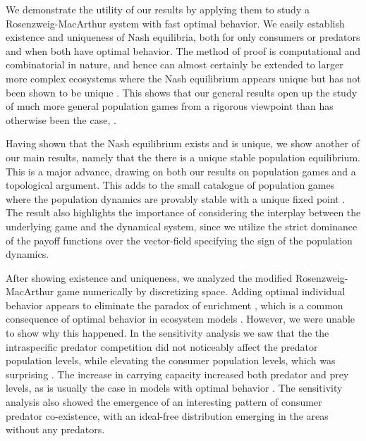 We demonstrate the utility of our results by applying them to study a Rosenzweig-MacArthur system with fast optimal behavior. We easily establish existence and uniqueness of Nash equilibria, both for only consumers or predators and when both have optimal behavior. The method of proof is computational and combinatorial in nature, and hence can almost certainly be extended to larger more complex ecosystems where the Nash equilibrium appears unique but has not been shown to be unique \cite{pinti2019trophic}. This shows that our general results open up the study of much more general population games from a rigorous viewpoint than has otherwise been the case, \citep{cressman2010ideal, kvrivan2013behavioral, kvrivan2009evolutionary, broom2013game}.

Having shown that the Nash equilibrium exists and is unique, we show another of our main results, namely that the there is a unique stable population equilibrium. This is a major advance, drawing on both our results on population games and a topological argument. This adds to the small catalogue of population games where the population dynamics are provably stable with a unique fixed point \citep{kvrivan2009evolutionary}. The result also highlights the importance of considering the interplay between the underlying game and the dynamical system, since we utilize the strict dominance of the payoff functions over the vector-field specifying the sign of the population dynamics.



After showing existence and uniqueness, we analyzed the modified Rosenzweig-MacArthur game numerically by discretizing space. Adding optimal individual behavior appears to eliminate the paradox of enrichment \citep{rosenzweig1971paradox}, which is a common consequence of optimal behavior in ecosystem models \citep{abrams2010implications, valdovinos2010consequences}. However, we were unable to show why this happened. In the sensitivity analysis we saw that the the intraspecific predator competition did not noticeably affect the predator population levels, while elevating the consumer population levels, which was surprising \citep{abrams2010implications}. The increase in carrying capacity increased both predator and prey levels, as is usually the case in models with optimal behavior \citep{valdovinos2010consequences}. The sensitivity analysis also showed the emergence of an interesting pattern of consumer predator co-existence, with an ideal-free distribution emerging in the areas without any predators.



